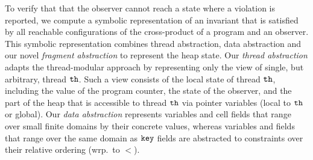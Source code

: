 To verify that that the observer cannot reach a state where a violation
is reported, we compute a symbolic representation
of an invariant that is satisfied by all reachable configurations of
the cross-product of a program  and an observer.
This symbolic representation combines thread abstraction, data abstraction
and our novel {\em fragment abstraction} to represent the heap state.
Our {\em thread abstraction} adapts the thread-modular approach by representing only the view of single, but arbitrary, thread ${\tt th}$. Such a view consists of
the local state of thread ${\tt th}$, including the value of the program counter,
the state of the observer, and
the part of the heap that is accessible to thread ${\tt th}$ via pointer variables (local to ${\tt th}$ or global).
Our {\em data abstraction} represents variables and cell
fields that range over small finite domains by their concrete values,
whereas variables and fields that range over the same domain as $\tt key$
fields are abstracted to constraints over their relative ordering (wrp.\ to $<$).

